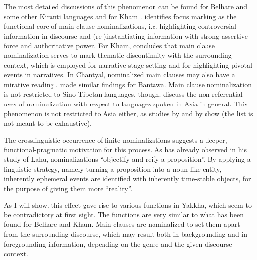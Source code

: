  The most detailed discussions of this phenomenon can be found for Belhare and some other Kiranti languages \citep{Bickel1999Nominalization} and for Kham \citep{Watters2002A-grammar}. \citet{Bickel1999Nominalization} identifies focus marking as the functional core of main clause nominalizations, i.e. highlighting controversial information in discourse and (re-)instantiating information with strong assertive force and authoritative power. For Kham, \citet[369]{Watters2002A-grammar} concludes that main clause nominalization serves to mark thematic discontinuity with the surrounding context, which is employed for narrative stage-setting and for highlighting pivotal events in narratives.  In Chantyal, nominalized main clauses may also have a mirative reading \citep{Noonan2008_Nominalization}. \citet[89]{Doornenbal2008_Nominalization} made similar findings for Bantawa. Main clause nominalization is not restricted to Sino-Tibetan languages, though. \citet{Yapetal2010_Non-referential} discuss the non-referential uses of nominalization with respect to languages spoken in Asia in general. This phenomenon is not restricted to Asia either, as studies by \citet{Woodbury1985Noun} and by \citet{Wegener2012_Savosavo} show (the list is not meant to be exhaustive). 
 
 The crosslinguistic occurrence of finite nominalizations suggests a deeper, func\-tional-prag\-matic motivation for this process. As \citet[246]{Matisoff1972Lahu} has already observed in his study of Lahu, nominalizations “objectify and reify a proposition”. By applying a linguistic strategy, namely turning a proposition into a noun-like entity, inherently ephemeral events are identified with inherently time-stable objects, for the purpose of giving them more “reality”. 
 
As I will show, this effect gave rise to various functions in Yakkha, which seem to be  contradictory at first sight. The functions are very similar to what has been found for Belhare and Kham. Main clauses are nominalized to set them apart from the surrounding discourse, which may result both in backgrounding and in foregrounding information, depending on the genre and the given discourse context.

 




